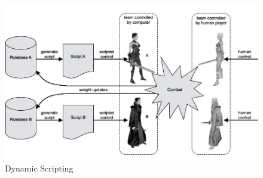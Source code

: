 \documentclass[journal]{IEEEtran}
\begin{document}
\begin{figure}[h]
	\includegraphics[width=1.0\linewidth]{dynamicscripting.jpg}
	\caption{Dynamic Scripting}
	\label{fig::21}
\end{figure} 
\end{document}
